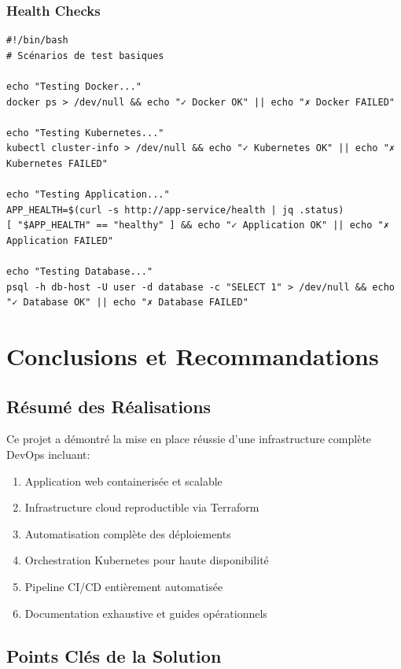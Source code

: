 \documentclass[12pt,a4paper]{report}
\begin{document}
\subsection{Health Checks}

\lstset{language=bash}
\begin{lstlisting}
#!/bin/bash
# Scénarios de test basiques

echo "Testing Docker..."
docker ps > /dev/null && echo "✓ Docker OK" || echo "✗ Docker FAILED"

echo "Testing Kubernetes..."
kubectl cluster-info > /dev/null && echo "✓ Kubernetes OK" || echo "✗ Kubernetes FAILED"

echo "Testing Application..."
APP_HEALTH=$(curl -s http://app-service/health | jq .status)
[ "$APP_HEALTH" == "healthy" ] && echo "✓ Application OK" || echo "✗ Application FAILED"

echo "Testing Database..."
psql -h db-host -U user -d database -c "SELECT 1" > /dev/null && echo "✓ Database OK" || echo "✗ Database FAILED"
\end{lstlisting}

\newpage

\chapter{Conclusions et Recommandations}

\section{Résumé des Réalisations}

Ce projet a démontré la mise en place réussie d'une infrastructure complète DevOps incluant:

\begin{enumerate}
    \item Application web containerisée et scalable
    \item Infrastructure cloud reproductible via Terraform
    \item Automatisation complète des déploiements
    \item Orchestration Kubernetes pour haute disponibilité
    \item Pipeline CI/CD entièrement automatisée
    \item Documentation exhaustive et guides opérationnels
\end{enumerate}

\section{Points Clés de la Solution}
\end{document}
